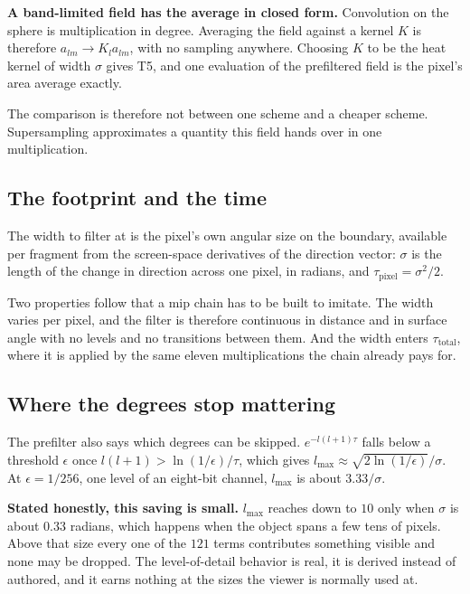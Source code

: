 \textbf{A band-limited field has the average in closed form.} Convolution on the sphere is multiplication in degree. Averaging the field against a kernel \(K\) is therefore \(a_{lm} \to K_l a_{lm}\), with no sampling anywhere. Choosing \(K\) to be the heat kernel of width \(\sigma\) gives T5, and one evaluation of the prefiltered field is the pixel's area average exactly.

The comparison is therefore not between one scheme and a cheaper scheme. Supersampling approximates a quantity this field hands over in one multiplication.

\subsection{The footprint and the time}

The width to filter at is the pixel's own angular size on the boundary, available per fragment from the screen-space derivatives of the direction vector: \(\sigma\) is the length of the change in direction across one pixel, in radians, and \(\tau_{\text{pixel}} = \sigma^2/2\).

Two properties follow that a mip chain has to be built to imitate. The width varies per pixel, and the filter is therefore continuous in distance and in surface angle with no levels and no transitions between them. And the width enters \(\tau_{\text{total}}\), where it is applied by the same eleven multiplications the chain already pays for.

\subsection{Where the degrees stop mattering}

The prefilter also says which degrees can be skipped. \(e^{-l(l+1)\tau}\) falls below a threshold \(\epsilon\) once \(l(l+1) > \ln(1/\epsilon)/\tau\), which gives \(l_{\max} \approx \sqrt{2\ln(1/\epsilon)}/\sigma\). At \(\epsilon = 1/256\), one level of an eight-bit channel, \(l_{\max}\) is about \(3.33/\sigma\).

\textbf{Stated honestly, this saving is small.} \(l_{\max}\) reaches down to \(10\) only when \(\sigma\) is about \(0.33\) radians, which happens when the object spans a few tens of pixels. Above that size every one of the \(121\) terms contributes something visible and none may be dropped. The level-of-detail behavior is real, it is derived instead of authored, and it earns nothing at the sizes the viewer is normally used at.

